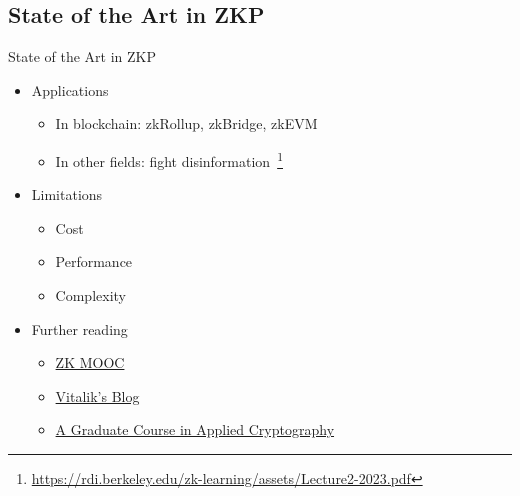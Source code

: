 \documentclass{beamer}
\begin{document}
  \subsection{State of the Art in ZKP}

  \begin{frame}{State of the Art in ZKP}
    \begin{itemize}
      \item Applications
      \begin{itemize}
        \item In blockchain: zkRollup, zkBridge, zkEVM
        \item In other fields: fight disinformation~\footnote{\url{https://rdi.berkeley.edu/zk-learning/assets/Lecture2-2023.pdf}}
      \end{itemize}
      \item Limitations
        \begin{itemize}
          \item Cost
          \item Performance
          \item Complexity
        \end{itemize}
      \item Further reading
        \begin{itemize}
          \item \href{https://rdi.berkeley.edu/zk-learning/}{ZK MOOC}
          \item \href{https://vitalik.eth.limo/general/2019/09/22/plonk.html}{Vitalik's Blog}
          \item \href{https://toc.cryptobook.us/}{A Graduate Course in Applied Cryptography}
        \end{itemize}
    \end{itemize}
  
  \end{frame}
\end{document}
